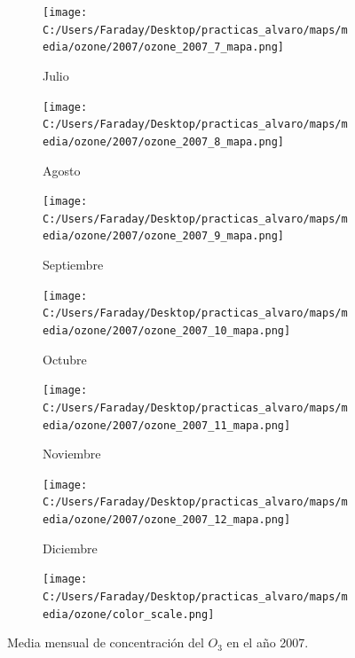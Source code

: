 \documentclass[12pt]{article}
\begin{document}
\begin{figure}[H]
\begin{subfigure}[H]{0.15\textwidth}
\texttt{[image: C:/Users/Faraday/Desktop/practicas\_alvaro/maps/media/ozone/2007/ozone\_2007\_7\_mapa.png]}
\captionsetup{labelformat=empty}
\caption{Julio}
\label{fig:map-ozone-2007-7}
\end{subfigure}
%
\begin{subfigure}[H]{0.15\textwidth}
\texttt{[image: C:/Users/Faraday/Desktop/practicas\_alvaro/maps/media/ozone/2007/ozone\_2007\_8\_mapa.png]}
\captionsetup{labelformat=empty}
\caption{Agosto}
\label{fig:map-ozone-2007-8}
\end{subfigure}
%
\begin{subfigure}[H]{0.15\textwidth}
\texttt{[image: C:/Users/Faraday/Desktop/practicas\_alvaro/maps/media/ozone/2007/ozone\_2007\_9\_mapa.png]}
\captionsetup{labelformat=empty}
\caption{Septiembre}
\label{fig:map-ozone-2007-9}
\end{subfigure}
%
\begin{subfigure}[H]{0.15\textwidth}
\texttt{[image: C:/Users/Faraday/Desktop/practicas\_alvaro/maps/media/ozone/2007/ozone\_2007\_10\_mapa.png]}
\captionsetup{labelformat=empty}
\caption{Octubre}
\label{fig:map-ozone-2007-10}
\end{subfigure}
%
\begin{subfigure}[H]{0.15\textwidth}
\texttt{[image: C:/Users/Faraday/Desktop/practicas\_alvaro/maps/media/ozone/2007/ozone\_2007\_11\_mapa.png]}
\captionsetup{labelformat=empty}
\caption{Noviembre}
\label{fig:map-ozone-2007-11}
\end{subfigure}
%
\begin{subfigure}[H]{0.15\textwidth}
\texttt{[image: C:/Users/Faraday/Desktop/practicas\_alvaro/maps/media/ozone/2007/ozone\_2007\_12\_mapa.png]}
\captionsetup{labelformat=empty}
\caption{Diciembre}
\label{fig:map-ozone-2007-12}
\end{subfigure}

\begin{subfigure}[H]{0.45\textwidth}
\texttt{[image: C:/Users/Faraday/Desktop/practicas\_alvaro/maps/media/ozone/color\_scale.png]}
\captionsetup{labelformat=empty}
\caption{}
\end{subfigure}

\vspace*{-7mm}
\caption{Media mensual de concentración del $O_{3}$ en el año 2007.}
\label{fig:map-ozone-2007}
\end{figure}
\end{document}
